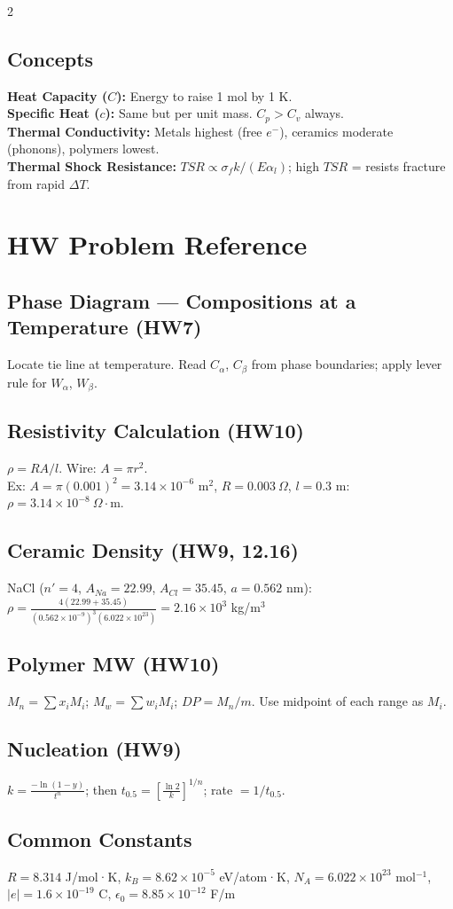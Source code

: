 \documentclass[8pt]{extarticle}
\begin{document}
\begin{multicols*}{2}
\subsection*{Concepts}
\textbf{Heat Capacity ($C$):} Energy to raise 1 mol by 1 K. \\
\textbf{Specific Heat ($c$):} Same but per unit mass. $C_p > C_v$ always. \\
\textbf{Thermal Conductivity:} Metals highest (free $e^-$), ceramics moderate (phonons), polymers lowest. \\
\textbf{Thermal Shock Resistance:} $TSR \propto \sigma_f k/(E\alpha_l)$; high $TSR$ = resists fracture from rapid $\Delta T$.

\section*{HW Problem Reference}
\subsection*{Phase Diagram — Compositions at a Temperature (HW7)}
Locate tie line at temperature. Read $C_\alpha$, $C_\beta$ from phase boundaries; apply lever rule for $W_\alpha$, $W_\beta$.
\subsection*{Resistivity Calculation (HW10)}
$\rho = RA/l$. Wire: $A=\pi r^2$. \\
Ex: $A=\pi(0.001)^2=3.14\times10^{-6}$ m$^2$, $R=0.003\ \Omega$, $l=0.3$ m: $\rho = 3.14\times10^{-8}\ \Omega\cdot$m.
\subsection*{Ceramic Density (HW9, 12.16)}
NaCl ($n'=4$, $A_{Na}=22.99$, $A_{Cl}=35.45$, $a=0.562$ nm): \\
$\rho = \frac{4(22.99+35.45)}{(0.562\times10^{-9})^3(6.022\times10^{23})} = 2.16\times10^3$ kg/m$^3$
\subsection*{Polymer MW (HW10)}
$M_n=\sum x_i M_i$; $M_w=\sum w_i M_i$; $DP=M_n/m$. Use midpoint of each range as $M_i$.
\subsection*{Nucleation (HW9)}
$k=\frac{-\ln(1-y)}{t^n}$; then $t_{0.5}=\left[\frac{\ln 2}{k}\right]^{1/n}$; rate $= 1/t_{0.5}$.
\subsection*{Common Constants}
$R=8.314$ J/mol·K, $k_B=8.62\times10^{-5}$ eV/atom·K, $N_A=6.022\times10^{23}$ mol$^{-1}$, \\
$|e|=1.6\times10^{-19}$ C, $\epsilon_0=8.85\times10^{-12}$ F/m

\end{multicols*}
\end{document}
